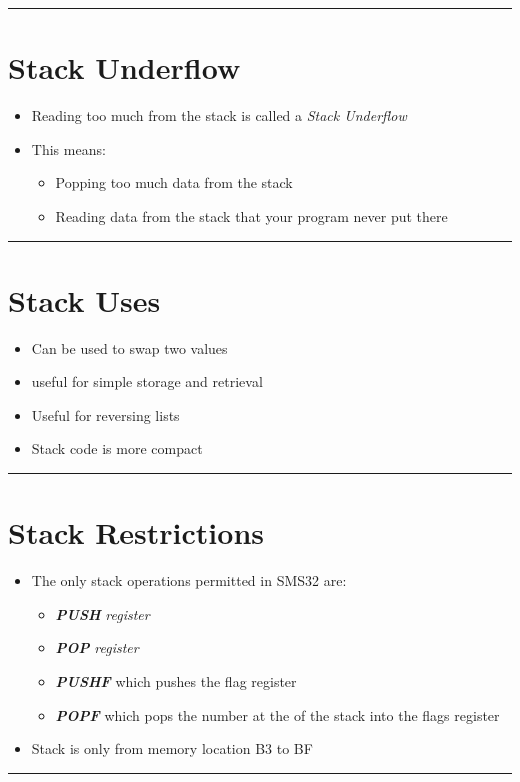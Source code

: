 \documentclass{article}
\begin{document}
\begin{center}
  \rule{.5\textwidth}{0.4pt}
\end{center}

\section{Stack Underflow}
\begin{itemize}
  \item{Reading too much from the stack is called a \textit{Stack Underflow}}
  \item{This means:}
  \begin{itemize}
    \item{Popping too much data from the stack}
    \item{Reading data from the stack that your program never put there}
  \end{itemize}
\end{itemize}

\begin{center}
  \rule{.5\textwidth}{0.4pt}
\end{center}

\section{Stack Uses}
\begin{itemize}
  \item{Can be used to swap two values}
  \item{useful for simple storage and retrieval}
  \item{Useful for reversing lists}
  \item{Stack code is more compact}
\end{itemize}

\begin{center}
  \rule{.5\textwidth}{0.4pt}
\end{center}

\section{Stack Restrictions}
\begin{itemize}
  \item{The only stack operations permitted in SMS32 are:}
  \begin{itemize}
    \item{\textbf{\textit{PUSH}} \textit{register}}
    \item{\textbf{\textit{POP}} \textit{register}}
    \item{\textbf{\textit{PUSHF}} which pushes the flag register}
    \item{\textbf{\textit{POPF}} which pops the number at the of the stack into the flags register}
  \end{itemize}
  \item{Stack is only from memory location B3 to BF}
\end{itemize}

\begin{center}
  \rule{.5\textwidth}{0.4pt}
\end{center}
\end{document}
